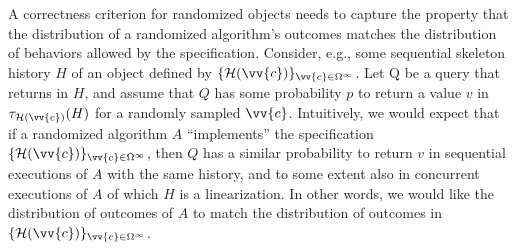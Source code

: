 



A correctness criterion for randomized objects needs to capture the property that the distribution of
a randomized algorithm's outcomes matches the distribution of behaviors allowed by the specification.
Consider, e.g., some sequential skeleton history $H$ of an object defined by $\{\mathcal{H}(\vv{c})\}_{\vv{c}\in \Omega^\infty}$. Let Q be a query
that returns in $H$, and assume that $Q$ has some probability $p$ to return a value $v$ in $\tau_{\mathcal{H}(\vv{c})}(H)$ for
a randomly sampled $\vv{c}$. Intuitively, we would expect that if a randomized algorithm $A$ ``implements'' the specification
$\{\mathcal{H}(\vv{c})\}_{\vv{c}\in \Omega^\infty}$, then $Q$ has a similar probability to return $v$ in sequential executions of $A$ with the same history,
and to some extent also in concurrent executions of $A$ of which $H$ is a linearization. In other words, we
would like the distribution of outcomes of $A$ to match the distribution of outcomes in $\{\mathcal{H}(\vv{c})\}_{\vv{c}\in \Omega^\infty}$.


